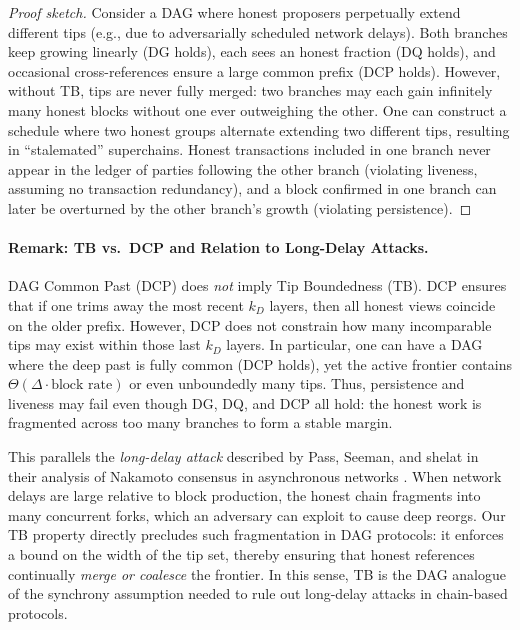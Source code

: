 \begin{proof}[Proof sketch]
Consider a DAG where honest proposers perpetually extend different tips (e.g., due
to adversarially scheduled network delays). Both branches keep growing linearly
(DG holds), each sees an honest fraction (DQ holds), and occasional cross-references
ensure a large common prefix (DCP holds). However, without TB, tips are never fully
merged: two branches may each gain infinitely many honest blocks without one ever
outweighing the other. One can construct a schedule where two honest groups alternate
extending two different tips, resulting in ``stalemated'' superchains. Honest
transactions included in one branch never appear in the ledger of parties following
the other branch (violating liveness, assuming no transaction redundancy), and a
block confirmed in one branch can later be overturned by the other branch’s growth
(violating persistence).
\end{proof}

\paragraph{Remark: TB vs.\ DCP and Relation to Long-Delay Attacks.}
DAG Common Past (DCP) does \emph{not} imply Tip Boundedness (TB). DCP ensures that if one trims away the most recent $k_D$ layers, then all honest views coincide on the older prefix. However, DCP does not constrain how many incomparable tips may exist within those last $k_D$ layers. In particular, one can have a DAG where the deep past is fully common (DCP holds), yet the active frontier contains $\Theta(\Delta \cdot \text{block rate})$ or even unboundedly many tips. Thus, persistence and liveness may fail even though DG, DQ, and DCP all hold: the honest work is fragmented across too many branches to form a stable margin.

This parallels the \emph{long-delay attack} described by Pass, Seeman, and shelat in their analysis of Nakamoto consensus in asynchronous networks \cite[Section~8]{EC:PasSeeShe17}. When network delays are large relative to block production, the honest chain fragments into many concurrent forks, which an adversary can exploit to cause deep reorgs. Our TB property directly precludes such fragmentation in DAG protocols: it enforces a bound on the width of the tip set, thereby ensuring that honest references continually \emph{merge or coalesce} the frontier. In this sense, TB is the DAG analogue of the synchrony assumption needed to rule out long-delay attacks in chain-based protocols.


